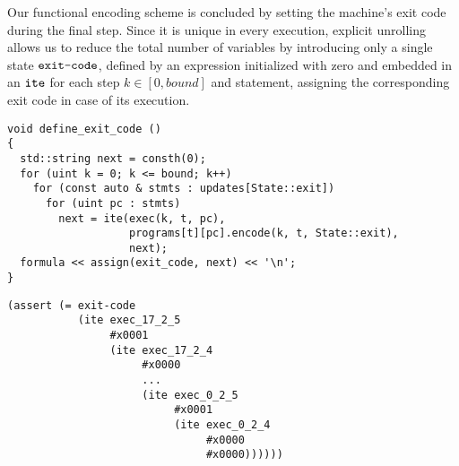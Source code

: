 \noindent
Our functional encoding scheme is concluded by setting the machine's exit code during the final step.
Since it is unique in every execution, explicit unrolling allows us to reduce the total number of variables by introducing only a single state $\texttt{exit-code}$, %
defined by an expression initialized with zero and embedded in an $\texttt{ite}$
for each step $k \in [0, bound]$ and  statement, assigning the corresponding exit code in case of its execution.

\begin{lstlisting}[style=c++]
void define_exit_code ()
{
  std::string next = consth(0);
  for (uint k = 0; k <= bound; k++)
    for (const auto & stmts : updates[State::exit])
      for (uint pc : stmts)
        next = ite(exec(k, t, pc),
                   programs[t][pc].encode(k, t, State::exit),
                   next);
  formula << assign(exit_code, next) << '\n';
}
\end{lstlisting}

\begin{lstlisting}[style=smtlib]
(assert (= exit-code
           (ite exec_17_2_5
                #x0001
                (ite exec_17_2_4
                     #x0000
                     ...
                     (ite exec_0_2_5
                          #x0001
                          (ite exec_0_2_4
                               #x0000
                               #x0000))))))
\end{lstlisting}

\newpage


